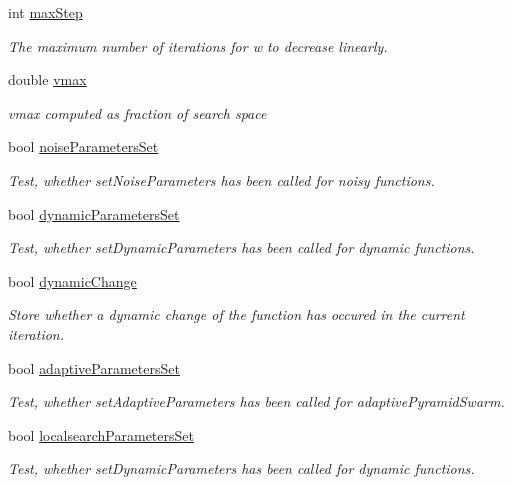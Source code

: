 \begin{CompactItemize}
int \hyperlink{classPSO_3c76804ce2232e1b250c5dcd32065f8d}{maxStep}
\begin{CompactList}\small\item\em The maximum number of iterations for w to decrease linearly. \item\end{CompactList}\item 
double \hyperlink{classPSO_7b76e07e3fcc1bdfa283bc5e63b5710c}{vmax}
\begin{CompactList}\small\item\em vmax computed as fraction of search space \item\end{CompactList}\item 
bool \hyperlink{classPSO_70073328867984f25a97b23430c2d228}{noiseParametersSet}
\begin{CompactList}\small\item\em Test, whether setNoiseParameters has been called for noisy functions. \item\end{CompactList}\item 
bool \hyperlink{classPSO_ec7784fadc5a754665bd1d25ada6c8b9}{dynamicParametersSet}
\begin{CompactList}\small\item\em Test, whether setDynamicParameters has been called for dynamic functions. \item\end{CompactList}\item 
bool \hyperlink{classPSO_70e82f9d6ccba90f8fefe9d66501af76}{dynamicChange}
\begin{CompactList}\small\item\em Store whether a dynamic change of the function has occured in the current iteration. \item\end{CompactList}\item 
bool \hyperlink{classPSO_cf59fa26a01091b3496f28756b56d88b}{adaptiveParametersSet}
\begin{CompactList}\small\item\em Test, whether setAdaptiveParameters has been called for adaptivePyramidSwarm. \item\end{CompactList}\item 
bool \hyperlink{classPSO_310f73da397718bc460c64fd62c3afef}{localsearchParametersSet}
\begin{CompactList}\small\item\em Test, whether setDynamicParameters has been called for dynamic functions. \item\end{CompactList}\item 

\end{CompactItemize}
